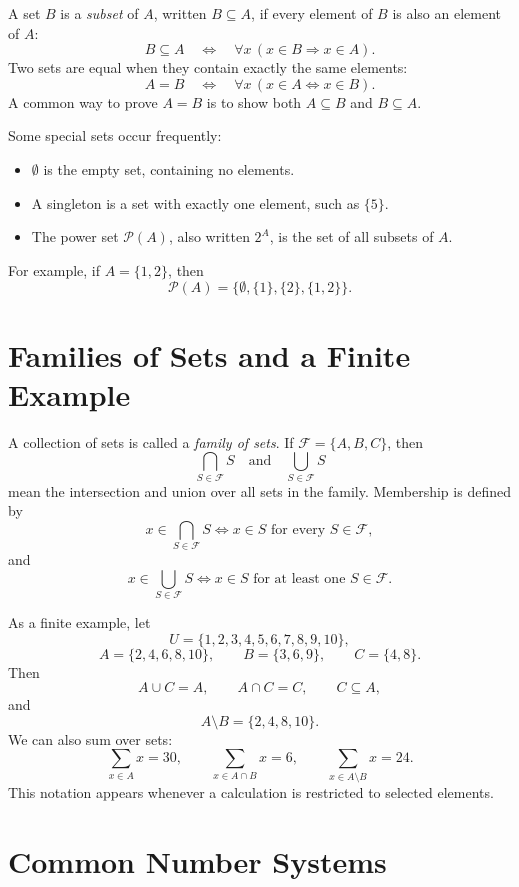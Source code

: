 A set \(B\) is a \emph{subset} of \(A\), written \(B\subseteq A\), if every element of \(B\) is also an element of \(A\):
\[
    B\subseteq A
    \quad\Longleftrightarrow\quad
    \forall x\,(x\in B\Rightarrow x\in A).
\]
Two sets are equal when they contain exactly the same elements:
\[
    A=B
    \quad\Longleftrightarrow\quad
    \forall x\,(x\in A\Leftrightarrow x\in B).
\]
A common way to prove \(A=B\) is to show both \(A\subseteq B\) and \(B\subseteq A\).

Some special sets occur frequently:
\begin{itemize}
    \item \(\emptyset\) is the empty set, containing no elements.
    \item A singleton is a set with exactly one element, such as \(\{5\}\).
    \item The power set \(\mathcal{P}(A)\), also written \(2^A\), is the set of all subsets of \(A\).
\end{itemize}
\label{mf:power-set}
For example, if \(A=\{1,2\}\), then
\[
    \mathcal{P}(A)=\{\emptyset,\{1\},\{2\},\{1,2\}\}.
\]

\section{Families of Sets and a Finite Example}
\label{mf:set-families}
\label{mf:indexed-unions-intersections}

A collection of sets is called a \emph{family of sets}. If \(\mathcal{F}=\{A,B,C\}\), then
\[
    \bigcap_{S\in\mathcal{F}}S
    \quad\text{and}\quad
    \bigcup_{S\in\mathcal{F}}S
\]
mean the intersection and union over all sets in the family. Membership is defined by
\[
    x\in\bigcap_{S\in\mathcal{F}}S
    \Longleftrightarrow x\in S\text{ for every }S\in\mathcal{F},
\]
and
\[
    x\in\bigcup_{S\in\mathcal{F}}S
    \Longleftrightarrow x\in S\text{ for at least one }S\in\mathcal{F}.
\]

As a finite example, let
\[
    U=\{1,2,3,4,5,6,7,8,9,10\},
\]
\[
    A=\{2,4,6,8,10\},\qquad B=\{3,6,9\},\qquad C=\{4,8\}.
\]
Then
\[
    A\cup C=A,\qquad A\cap C=C,\qquad C\subseteq A,
\]
and
\[
    A\setminus B=\{2,4,8,10\}.
\]
We can also sum over sets:
\[
    \sum_{x\in A}x=30,
    \qquad
    \sum_{x\in A\cap B}x=6,
    \qquad
    \sum_{x\in A\setminus B}x=24.
\]
This notation appears whenever a calculation is restricted to selected elements.
\label{mf:finite-universe-example}
\label{mf:set-sums}

\section{Common Number Systems}
\label{mf:common-number-systems}

